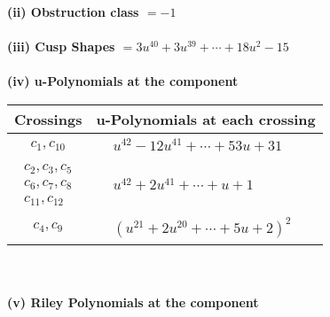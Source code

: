 \documentclass[1p]{elsarticle_modified}
\theoremstyle{definition}
\begin{document}
\flushleft \textbf{(ii) Obstruction class $= -1$}\\~\\
\flushleft \textbf{(iii) Cusp Shapes $= 3 u^{40}+3 u^{39}+\cdots+18 u^2-15$}\\~\\
\newpage\renewcommand{\arraystretch}{1}
\flushleft \textbf{(iv) u-Polynomials at the component}\newline \\
\begin{tabular}{m{50pt}|m{274pt}}
Crossings & \hspace{64pt}u-Polynomials at each crossing \\
\hline $$\begin{aligned}c_{1},c_{10}\end{aligned}$$&$\begin{aligned}
&u^{42}-12 u^{41}+\cdots+53 u+31
\end{aligned}$\\
\hline $$\begin{aligned}c_{2},c_{3},c_{5}\\c_{6},c_{7},c_{8}\\c_{11},c_{12}\end{aligned}$$&$\begin{aligned}
&u^{42}+2 u^{41}+\cdots+u+1
\end{aligned}$\\
\hline $$\begin{aligned}c_{4},c_{9}\end{aligned}$$&$\begin{aligned}
&(u^{21}+2 u^{20}+\cdots+5 u+2)^{2}
\end{aligned}$\\
\hline
\end{tabular}\\~\\
\newpage\renewcommand{\arraystretch}{1}
\flushleft \textbf{(v) Riley Polynomials at the component}\newline \\
\end{document}

